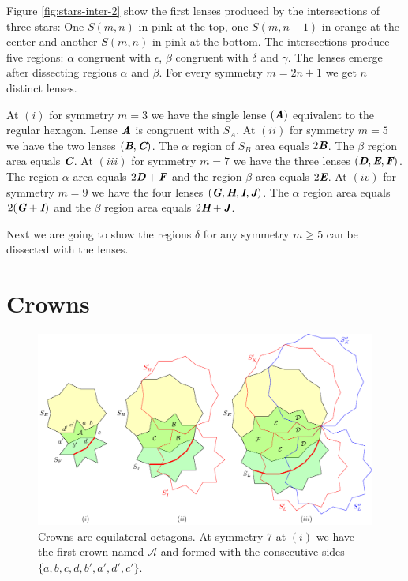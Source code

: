 \documentclass[11pt]{article}
\def\mathbi#1{\textbf{\em #1}}
\begin{document}
Figure \ref{fig:stars-inter-2} show the first lenses produced by the intersections of three stars: One $S(m,n)$ in pink at the top, one $S(m,n-1)$ in orange at the center and another $S(m,n)$ in pink at the bottom. The intersections produce five regions: $\alpha$ congruent with $\epsilon$, $\beta$ congruent with $\delta$ and $\gamma$. The lenses emerge after dissecting regions $\alpha$ and $\beta$. For every symmetry $m = 2n+1$ we get $n$ distinct lenses.

At $(i)$ for symmetry $m=3$ we have the single lense $(\mathbi{A})$ equivalent to the regular hexagon. Lense $\mathbi{A}$ is congruent with $S_A$.
At $(ii)$ for symmetry $m=5$ we have the two lenses $(\mathbi{B},\mathbi{C})$. The $\alpha$ region of $S_B$ area equals $2\mathbi{B}$. The $\beta$ region area equals $\mathbi{C}$.
At $(iii)$ for symmetry $m=7$ we have the three lenses $(\mathbi{D},\mathbi{E},\mathbi{F})$. The region $\alpha$ area equals $2\mathbi{D} + \mathbi{F}$ and the region $\beta$ area equals $2\mathbi{E}$.
At $(iv)$ for symmetry $m=9$ we have the four lenses $(\mathbi{G},\mathbi{H},\mathbi{I},\mathbi{J})$. The $\alpha$ region area equals $2(\mathbi{G}+\mathbi{I})$ and the $\beta$ region area equals $2\mathbi{H} + \mathbi{J}$.

Next we are going to show the regions $\delta$ for any symmetry $m \ge 5$ can be dissected with the lenses.

\section{Crowns}

\begin{figure}[H]
\centering
\includegraphics[scale=1]{stars/inter-4}
\caption{Crowns are equilateral octagons. At symmetry $7$ at $(i)$ we have the first crown named $\mathcal{A}$ and formed with the consecutive sides $\{a,b,c,d,b',a',d',c'\}$.
}
\label{fig:stars-inter-4}
\end{figure}
\end{document}
